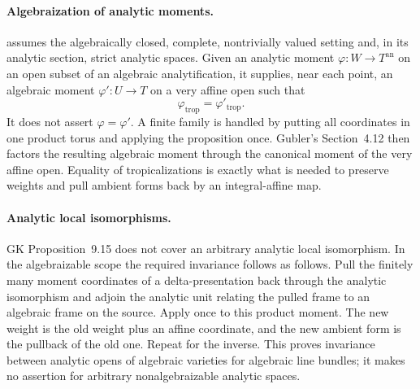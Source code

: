 \paragraph{Algebraization of analytic moments.}
\cite[Proposition~7.2]{Gub16} assumes the algebraically closed, complete,
nontrivially valued setting and, in its analytic section, strict analytic
spaces.  Given an analytic moment
\(\varphi:W\to T^{\mathrm{an}}\) on an open subset of an algebraic
analytification, it supplies, near each point, an algebraic moment
\(\varphi':U\to T\) on a very affine open such that
\[
                 \varphi_{\mathrm{trop}}
                 =\varphi'_{\mathrm{trop}}.
\]
It does not assert \(\varphi=\varphi'\).  A finite family is handled by
putting all coordinates in one product torus and applying the proposition
once.  Gubler's Section~4.12 then factors the resulting algebraic moment
through the canonical moment of the very affine open.  Equality of
tropicalizations is exactly what is needed to preserve weights and pull
ambient forms back by an integral-affine map.

\paragraph{Analytic local isomorphisms.}
GK Proposition~9.15 does not cover an arbitrary analytic local
isomorphism.  In the algebraizable scope the required invariance follows as
follows.  Pull the finitely many moment coordinates of a delta-presentation
back through the analytic isomorphism and adjoin the analytic unit relating
the pulled frame to an algebraic frame on the source.  Apply
\cite[Proposition~7.2]{Gub16} once to this product moment.  The new weight is
the old weight plus an affine coordinate, and the new ambient form is the
pullback of the old one.  Repeat for the inverse.  This proves invariance
between analytic opens of algebraic varieties for algebraic line bundles;
it makes no assertion for arbitrary nonalgebraizable analytic spaces.


